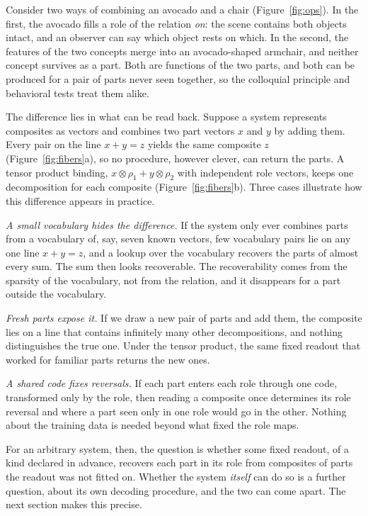 \documentclass[10pt]{article}
\theoremstyle{plain}
\theoremstyle{remark}
\begin{document}
Consider two ways of combining an avocado and a chair (Figure~\ref{fig:ops}). In the first, the avocado fills a role of the relation \emph{on}: the scene contains both objects intact, and an observer can say which object rests on which. In the second, the features of the two concepts merge into an avocado-shaped armchair, and neither concept survives as a part. Both are functions of the two parts, and both can be produced for a pair of parts never seen together, so the colloquial principle and behavioral tests treat them alike.

The difference lies in what can be read back. Suppose a system represents composites as vectors and combines two part vectors $x$ and $y$ by adding them. Every pair on the line $x + y = z$ yields the same composite $z$ (Figure~\ref{fig:fibers}a), so no procedure, however clever, can return the parts. A tensor product binding, $x \otimes \rho_1 + y \otimes \rho_2$ with independent role vectors, keeps one decomposition for each composite (Figure~\ref{fig:fibers}b). Three cases illustrate how this difference appears in practice.

\emph{A small vocabulary hides the difference.} If the system only ever combines parts from a vocabulary of, say, seven known vectors, few vocabulary pairs lie on any one line $x + y = z$, and a lookup over the vocabulary recovers the parts of almost every sum. The sum then looks recoverable. The recoverability comes from the sparsity of the vocabulary, not from the relation, and it disappears for a part outside the vocabulary.

\emph{Fresh parts expose it.} If we draw a new pair of parts and add them, the composite lies on a line that contains infinitely many other decompositions, and nothing distinguishes the true one. Under the tensor product, the same fixed readout that worked for familiar parts returns the new ones.

\emph{A shared code fixes reversals.} If each part enters each role through one code, transformed only by the role, then reading a composite once determines its role reversal and where a part seen only in one role would go in the other. Nothing about the training data is needed beyond what fixed the role maps.

For an arbitrary system, then, the question is whether some fixed readout, of a kind declared in advance, recovers each part in its role from composites of parts the readout was not fitted on. Whether the system \emph{itself} can do so is a further question, about its own decoding procedure, and the two can come apart. The next section makes this precise.
\end{document}
